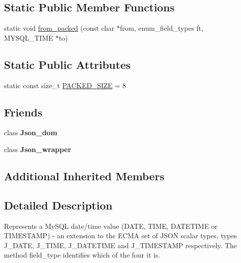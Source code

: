 \subsection*{Static Public Member Functions}
\begin{DoxyCompactItemize}
\item 
static void \mbox{\hyperlink{classJson__datetime_ab7477e110d3a4d88a7caf6c5559db1be}{from\+\_\+packed}} (const char $\ast$from, enum\+\_\+field\+\_\+types ft, M\+Y\+S\+Q\+L\+\_\+\+T\+I\+ME $\ast$to)
\end{DoxyCompactItemize}
\subsection*{Static Public Attributes}
\begin{DoxyCompactItemize}
\item 
static const size\+\_\+t \mbox{\hyperlink{classJson__datetime_ac18eb9fb33e2a1cf151a7a6a748e4212}{P\+A\+C\+K\+E\+D\+\_\+\+S\+I\+ZE}} = 8
\end{DoxyCompactItemize}
\subsection*{Friends}
\begin{DoxyCompactItemize}
\item 
\mbox{\label{classJson__datetime_a033e7dd9698db64d895c552a296b88b0}} 
class {\bfseries Json\+\_\+dom}
\item 
\mbox{\label{classJson__datetime_a98e93450f231dee2765955e5acaef3eb}} 
class {\bfseries Json\+\_\+wrapper}
\end{DoxyCompactItemize}
\subsection*{Additional Inherited Members}


\subsection{Detailed Description}
Represents a My\+S\+QL date/time value (D\+A\+TE, T\+I\+ME, D\+A\+T\+E\+T\+I\+ME or T\+I\+M\+E\+S\+T\+A\+MP) -\/ an extension to the E\+C\+MA set of J\+S\+ON scalar types, types J\+\_\+\+D\+A\+TE, J\+\_\+\+T\+I\+ME, J\+\_\+\+D\+A\+T\+E\+T\+I\+ME and J\+\_\+\+T\+I\+M\+E\+S\+T\+A\+MP respectively. The method field\+\_\+type identifies which of the four it is. 

